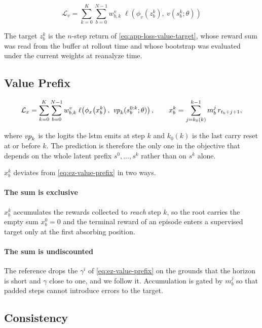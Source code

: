 \begin{equation}\label{eq:app-loss-value}
  \mathcal{L}_v=\sum_{k=0}^{K}\sum_{b=0}^{N-1}w^v_{b,k}\;
  \ell\!\left(\phi_v\!\left(z^k_b\right),\ v(s^k_b;\theta)\right)
\end{equation}

The target $z^k_b$ is the $n$-step return of \cref{eq:app-loss-value-target}, whose reward sum was
read from the buffer at rollout time and whose bootstrap was evaluated under the current weights at
reanalyze time.

\subsection{Value Prefix}\label{sec:app-loss-vp}

\begin{equation}\label{eq:app-loss-vp}
  \mathcal{L}_x=\sum_{k=0}^{K}\sum_{b=0}^{N-1}w^v_{b,k}\;
  \ell\!\left(\phi_x\!\left(x^k_b\right),\ \vpnet_k(s^{0:k}_b;\theta)\right),
  \qquad
  x^k_b=\sum_{j=k_0(k)}^{k-1}m^j_b\,r_{t_b+j+1},
\end{equation}

where $\mathit{vp}_k$ is the logits the \gls{lstm} emits at step $k$ and $k_0(k)$ is the last carry
reset at or before $k$.
The prediction is therefore the only one in the objective that depends on the whole latent prefix
$s^0,\dots,s^k$ rather than on $s^k$ alone.

$x^k_b$ deviates from \cref{eq:ez-value-prefix} in two ways.

\paragraph{The sum is exclusive}
$x^k_b$ accumulates the rewards collected to \emph{reach} step $k$, so the root carries the empty
sum $x^0_b=0$ and the terminal reward of an episode enters a supervised target only at the first
absorbing position.

\paragraph{The sum is undiscounted}
The reference drops the $\gamma^{i}$ of \cref{eq:ez-value-prefix} on the grounds that the horizon
is short and $\gamma$ close to one, and we follow it.
Accumulation is gated by $m^j_b$ so that padded steps cannot introduce errors to the target.

\subsection{Consistency}\label{sec:app-loss-consistency}

